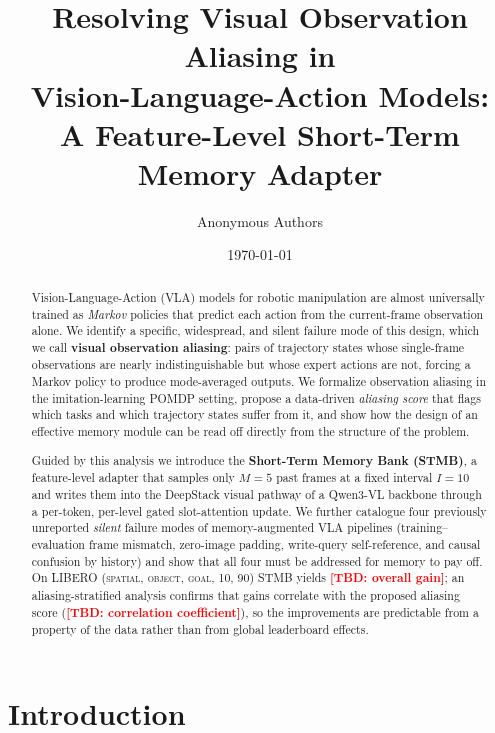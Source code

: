 \documentclass[11pt]{article}
\title{Resolving Visual Observation Aliasing in\\
Vision-Language-Action Models:\\
A Feature-Level Short-Term Memory Adapter}
\author[1]{Anonymous Authors}
\affil[1]{Anonymous Institution}
\date{\today}
\newcommand{\todo}[1]{\textcolor{red}{\textbf{[TBD: #1]}}}
\begin{document}
\maketitle

\begin{abstract}
Vision-Language-Action (VLA) models for robotic manipulation are almost universally
trained as \emph{Markov} policies that predict each action from the current-frame
observation alone. We identify a specific, widespread, and silent failure mode of
this design, which we call \textbf{visual observation aliasing}: pairs of trajectory
states whose single-frame observations are nearly indistinguishable but whose expert
actions are not, forcing a Markov policy to produce mode-averaged outputs. We
formalize observation aliasing in the imitation-learning POMDP setting, propose a
data-driven \emph{aliasing score} that flags which tasks and which trajectory states
suffer from it, and show how the design of an effective memory module can be read
off directly from the structure of the problem.

Guided by this analysis we introduce the \textbf{Short-Term Memory Bank (STMB)}, a
feature-level adapter that samples only $M{=}5$ past frames at a fixed interval
$I{=}10$ and writes them into the DeepStack visual pathway of a Qwen3-VL backbone
through a per-token, per-level gated slot-attention update. We further catalogue four
previously unreported \emph{silent} failure modes of memory-augmented VLA pipelines
(training--evaluation frame mismatch, zero-image padding, write-query self-reference,
and causal confusion by history) and show that all four must be addressed for memory
to pay off. On LIBERO (\textsc{spatial}, \textsc{object}, \textsc{goal}, \textsc{10},
\textsc{90}) STMB yields \todo{overall gain}; an aliasing-stratified analysis
confirms that gains correlate with the proposed aliasing score
(\todo{correlation coefficient}), so the improvements are predictable from a
property of the data rather than from global leaderboard effects.
\end{abstract}

\section{Introduction}
\label{sec:intro}
\end{document}
